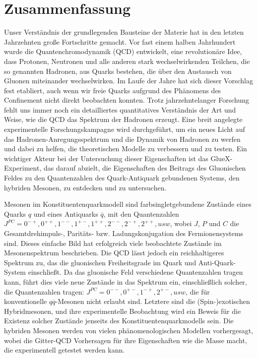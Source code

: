 \chapter{Zusammenfassung}
\label{chap.zusammen}

Unser Verständnis der grundlegenden Bausteine der Materie hat in den letzten Jahrzehnten große Fortschritte gemacht. Vor fast einem halben Jahrhundert wurde die Quantenchromodynamik (QCD) entwickelt, eine revolutionäre Idee, dass Protonen, Neutronen und alle anderen stark wechselwirkenden Teilchen, die so genannten Hadronen, aus Quarks bestehen, die über den Austausch von Gluonen miteinander wechselwirken. Im Laufe der Jahre hat sich dieser Vorschlag fest etabliert, auch wenn wir freie Quarks aufgrund des Phänomens des Confinement nicht direkt beobachten konnten. Trotz jahrzehntelanger Forschung fehlt uns immer noch ein detailliertes quantitatives Verständnis der Art und Weise, wie die QCD das Spektrum der Hadronen erzeugt. Eine breit angelegte experimentelle Forschungskampagne wird durchgeführt, um ein neues Licht auf das Hadronen-Anregungsspektrum und die Dynamik von Hadronen zu werfen und dabei zu helfen, die theoretischen Modelle zu verbessern und zu testen. Ein wichtiger Akteur bei der Untersuchung dieser Eigenschaften ist das GlueX-Experiment, das darauf abzielt, die Eigenschaften des Beitrags des Gluonischen Feldes zu den Quantenzahlen des Quark-Antiquark gebundenen Systems, den hybriden Mesonen, zu entdecken und zu untersuchen.
~\par Mesonen im Konstituentenquarkmodell sind farbsingletgebundene Zustände eines Quarks $q$ und eines Antiquarks $\overline{q}$, mit den Quantenzahlen $J^{PC} = 0^{-+}, 0^{++}, 1^{--}, 1^{+-}, 1^{++}, 2^{--}, 2^{-+}, 2^{++}, usw$, wobei $J$, $P$ und $C$ die Gesamtdrehimpuls-, Paritäts- bzw. Ladungskonjugation des Fermionensystems sind. Dieses einfache Bild hat erfolgreich viele beobachtete Zustände im Mesonenspektrum beschrieben. Die QCD lässt jedoch ein reichhaltigeres Spektrum zu, das die gluonischen Freiheitsgrade im Quark und Anti-Quark-System einschließt. Da das gluonische Feld verschiedene Quantenzahlen tragen kann, führt dies viele neue Zustände in das Spektrum ein, einschließlich solcher, die Quantenzahlen tragen: $J^{PC} = 0^{--}, 0^{+-}, 1^{-+}, 2^{+-}, usw$, die für konventionelle $q\overline{q}$-Mesonen nicht erlaubt sind. Letztere sind die (Spin-)exotischen Hybridmesonen, und ihre experimentelle Beobachtung wird ein Beweis für die Existenz solcher Zustände jenseits des Konstituentenquarkmodells sein. Die hybriden Mesonen werden von vielen phänomenologischen Modellen vorhergesagt, wobei die Gitter-QCD Vorhersagen für ihre Eigenschaften wie die Masse macht, die experimentell getestet werden kann.

